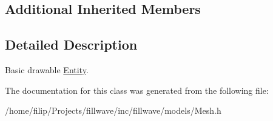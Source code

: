 \subsection*{Additional Inherited Members}


\subsection{Detailed Description}
Basic drawable \hyperlink{classflw_1_1flf_1_1Entity}{Entity}. 

The documentation for this class was generated from the following file\+:\begin{DoxyCompactItemize}
\item 
/home/filip/\+Projects/fillwave/inc/fillwave/models/Mesh.\+h\end{DoxyCompactItemize}
